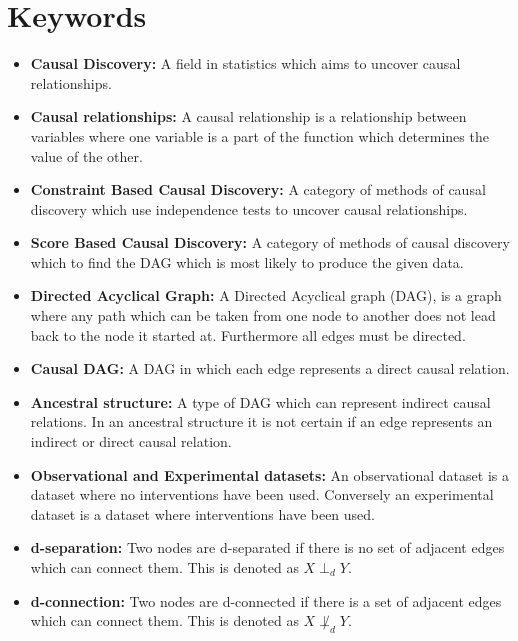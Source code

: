 \documentclass[11pt]{article}
\newcommand{\Sara}[1]{{\color{blue} Sara: #1}}
\begin{document}
\section{Keywords}
\begin{itemize}
    \item \textbf{Causal Discovery:} A field in statistics which aims to uncover causal relationships.
    \item \textbf{Causal relationships:} A causal relationship is a relationship between variables where one variable is a part of the function which determines the value of the other. %
    \item \textbf{Constraint Based Causal Discovery:}  A category of methods of causal discovery which use independence tests to uncover causal relationships. 
    \item \textbf{Score Based Causal Discovery:} A category of methods of causal discovery which to find the DAG which is most likely to produce the given data.
    \item \textbf{Directed Acyclical Graph:} A Directed Acyclical graph (DAG), is a graph where any path which can be taken from one node to another does not lead back to the node it started at. Furthermore all edges must be directed.
    \item \textbf{Causal DAG:} A DAG in which each edge represents a direct causal relation.
    \item \textbf{Ancestral structure:} A type of DAG which can represent indirect causal relations. In an ancestral structure it is not certain if an edge represents an indirect or direct causal relation. 
    \item \textbf{Observational and Experimental datasets:} An observational dataset is a dataset where no interventions have been used. Conversely an experimental dataset is a dataset where interventions have been used.
    \item \textbf{d-separation:} Two nodes are d-separated if there is no set of adjacent edges which can connect them. This is denoted as $X \perp_d Y$.
    \item \textbf{d-connection:} Two nodes are d-connected if there is a set of adjacent edges which can connect them. This is denoted as $X \not\perp_d Y$.

\end{itemize}
\end{document}
